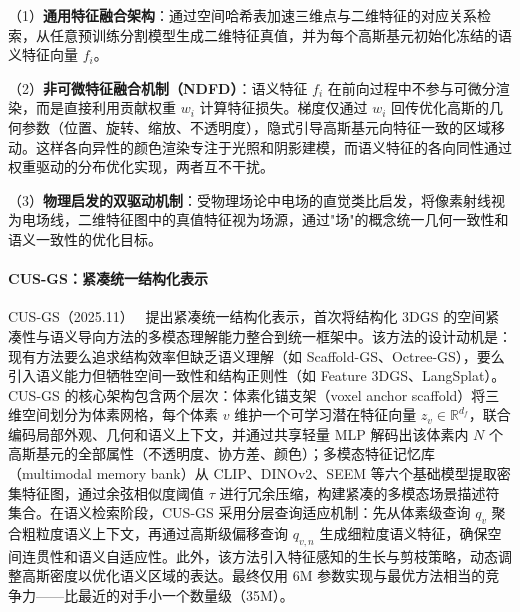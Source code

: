 （1）\textbf{通用特征融合架构}：通过空间哈希表加速三维点与二维特征的对应关系检索，从任意预训练分割模型生成二维特征真值，并为每个高斯基元初始化冻结的语义特征向量 $f_i$。

（2）\textbf{非可微特征融合机制（NDFD）}：语义特征 $f_i$ 在前向过程中不参与可微分渲染，而是直接利用贡献权重 $w_i$ 计算特征损失。梯度仅通过 $w_i$ 回传优化高斯的几何参数（位置、旋转、缩放、不透明度），隐式引导高斯基元向特征一致的区域移动。这样各向异性的颜色渲染专注于光照和阴影建模，而语义特征的各向同性通过权重驱动的分布优化实现，两者互不干扰。

（3）\textbf{物理启发的双驱动机制}：受物理场论中电场的直觉类比启发，将像素射线视为电场线，二维特征图中的真值特征视为场源，通过"场"的概念统一几何一致性和语义一致性的优化目标。

\paragraph{CUS-GS：紧凑统一结构化表示} CUS-GS（2025.11）~\cite{2511_17904} 提出紧凑统一结构化表示，首次将结构化 3DGS 的空间紧凑性与语义导向方法的多模态理解能力整合到统一框架中。该方法的设计动机是：现有方法要么追求结构效率但缺乏语义理解（如 Scaffold-GS、Octree-GS），要么引入语义能力但牺牲空间一致性和结构正则性（如 Feature 3DGS、LangSplat）。CUS-GS 的核心架构包含两个层次：体素化锚支架（voxel anchor scaffold）将三维空间划分为体素网格，每个体素 $v$ 维护一个可学习潜在特征向量 $z_v \in \mathbb{R}^{d_f}$，联合编码局部外观、几何和语义上下文，并通过共享轻量 MLP 解码出该体素内 $N$ 个高斯基元的全部属性（不透明度、协方差、颜色）；多模态特征记忆库（multimodal memory bank）从 CLIP、DINOv2、SEEM 等六个基础模型提取密集特征图，通过余弦相似度阈值 $\tau$ 进行冗余压缩，构建紧凑的多模态场景描述符集合。在语义检索阶段，CUS-GS 采用分层查询适应机制：先从体素级查询 $q_v$ 聚合粗粒度语义上下文，再通过高斯级偏移查询 $q_{v,n}$ 生成细粒度语义特征，确保空间连贯性和语义自适应性。此外，该方法引入特征感知的生长与剪枝策略，动态调整高斯密度以优化语义区域的表达。最终仅用 6M 参数实现与最优方法相当的竞争力——比最近的对手小一个数量级（35M）。

